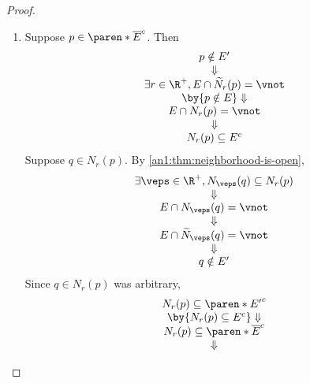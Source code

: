 \begin{proof}
  \leavevmode\par
  \begin{enumerate}[label=\textbf{(\Alph*)}]
    \item Suppose $p \in \paren*{\overline{E}}^{c}$. Then
          \[
            \begin{array}{c}
              p \notin E'                                               \\
              \Downarrow                                                \\
              \exists r \in \R^{+}, E \cap \widetilde{N}_{r}(p) = \vnot \\
              \by{\ensuremath{p \notin E}} \Downarrow                   \\
              E \cap N_{r}(p) = \vnot                                   \\
              \Downarrow                                                \\
              N_{r}(p) \subseteq E^{c}
            \end{array}
          \]
          Suppose $q \in N_{r}(p)$. By \cref{an1:thm:neighborhood-is-open},
          \[
            \begin{array}{c}
              \exists \veps \in \R^{+}, N_{\veps}(q) \subseteq N_{r}(p) \\
              \Downarrow                                                \\
              E \cap N_{\veps}(q) = \vnot                               \\
              \Downarrow                                                \\
              E \cap \widetilde{N}_{\veps}(q) = \vnot                   \\
              \Downarrow                                                \\
              q \notin E'
            \end{array}
          \]
          Since $q \in N_{r}(p)$ was arbitrary,
          \[
            \begin{array}{c}
              N_{r}(p) \subseteq \paren*{E'}^{c}                    \\
              \by{\ensuremath{N_{r}(p) \subseteq E^{c}}} \Downarrow \\
              N_{r}(p) \subseteq \paren*{\overline{E}}^{c}          \\
              \Downarrow                                            \\

\end{array}\]
\end{enumerate}
\end{proof}
